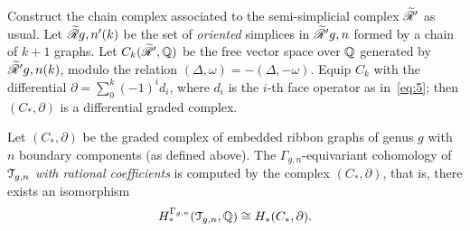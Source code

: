 Construct the chain complex associated to the semi-simplicial complex
$\mathscr{\widetilde R}_{}'$ as usual.  Let $\mathscr{\widetilde R}_{}{g,n}'(k)$ be the set of \emph{oriented}
simplices in $\mathscr{\widetilde R}_{}'{g,n}$ formed by a chain of $k+1$ graphs.
Let $C_k(\mathscr{\widetilde R}_{}', \mathbb{Q})$ be the free vector space over $\mathbb{Q}$ generated by
$\mathscr{\widetilde R}_{}'{g,n}(k)$, modulo the relation $(\Delta, \omega) = -(\Delta, -\omega)$.  Equip $C_k$
with the differential $\partial = \sum_0^k (-1)^id_i$, where $d_i$ is the $i$-th
face operator as in~\eqref{eq:5}; then $(C_*, \partial)$ is a differential
graded complex.
\begin{lemma}
  \label{lemma:erg-iso}
  Let $(C_*, \partial)$ be the graded complex of embedded ribbon graphs of
  genus $g$ with $n$ boundary components (as defined above).  The
  $\Gamma_{g,n}$-equivariant cohomology of $\mathcal{T}_{g,n}$ \emph{with rational
    coefficients} is computed by the complex $(C_*, \partial)$, that is,
  there exists an isomorphism
  \begin{equation*}
    H^{\Gamma_{g,n}}_*(\mathcal{T}_{g,n}, \mathbb{Q}) \cong H_*(C_*, \partial).
  \end{equation*}
\end{lemma}
